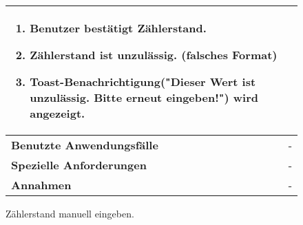 \begin{figure}[h]
\begin{tabularx}{\textwidth}{ X | X }
\begin{enumerate}
			\item Benutzer bestätigt Zählerstand.
			\item Zählerstand ist unzulässig. (falsches Format)
			\item Toast-Benachrichtigung("Dieser Wert ist unzulässig. Bitte erneut eingeben!") wird angezeigt. 
		\end{enumerate}  \\ \hline
		\textbf{Benutzte Anwendungsfälle} & - \\ \hline
		\textbf{Spezielle Anforderungen} & - \\ \hline
		\textbf{Annahmen} & -
	\end{tabularx}
	\caption{Zählerstand manuell eingeben.}
	\label{fig:anwendungsfall-server-tabelle-xx-1}
\end{figure}

